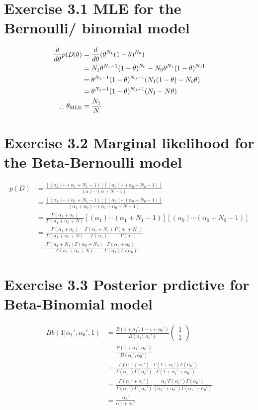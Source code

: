 \documentclass{jsarticle}
\begin{document}
\section*{Exercise 3.1 MLE for the Bernoulli/ binomial model}
\begin{align}
\frac{d}{d\theta}p(D|\theta) & = \frac{d}{d\theta}(\theta^{N_1}(1-\theta)^{N_0})\\
& = N_1 \theta^{N_1-1}(1-\theta)^{N_0}-N_0\theta^{N_1}(1-\theta)^{N_01}\\
& = \theta^{N_1-1}(1-\theta)^{N_0-1}(N_1(1-\theta)-N_0\theta) \\
& = \theta^{N_1-1}(1-\theta)^{N_0-1}(N_1-N\theta)\\
\therefore \theta_{\rm MLE} & =\frac{N_1}{N}
\end{align}

\section*{Exercise 3.2 Marginal likelihood for the Beta-Bernoulli model}
\begin{align}
p(D) & = \frac{[(\alpha_1)\cdots(\alpha_1+N_1-1)][(\alpha_0)\cdots(\alpha_0+N_0-1)]}{(\alpha)\cdots(\alpha + N - 1)}\\
& = \frac{[(\alpha_1)\cdots(\alpha_1+N_1-1)][(\alpha_0)\cdots(\alpha_0+N_0-1)]}{(\alpha_1+\alpha_0)\cdots(\alpha_1 + \alpha_0 + N - 1)}\\
& = \frac{\Gamma(\alpha_1+\alpha_0)}{\Gamma(\alpha_1+\alpha_0+N)}[(\alpha_1)\cdots (\alpha_1+N_1-1)][(\alpha_0)\cdots(\alpha_0+N_0-1)]\\
& = \frac{\Gamma(\alpha_1+\alpha_0)}{\Gamma(\alpha_1+\alpha_0+N)}\frac{\Gamma(\alpha_1+N_1)}{\Gamma(\alpha_1)}\frac{\Gamma(\alpha_0+N_0)}{\Gamma(\alpha_0)}\\
& = \frac{\Gamma(\alpha_1+N_1)\Gamma(\alpha_0+N_0)}{\Gamma(\alpha_1+\alpha_0+N)}\frac{\Gamma(\alpha_1+\alpha_0)}{\Gamma(\alpha_1)\Gamma(\alpha_0)}
\end{align}

\section*{Exercise 3.3 Posterior prdictive for Beta-Binomial model}
\begin{align}
Bb(1|\alpha_1',\alpha_0',1) & = \frac{B(1+\alpha_1',1-1+\alpha_0')}{B(\alpha_1',\alpha_0')} \begin{pmatrix} 1 \\ 1 \end{pmatrix} \\
& = \frac{B(1+\alpha_1', \alpha_0')}{B(\alpha_1',\alpha_0')}\\
& = \frac{\Gamma(\alpha_1'+\alpha_0')}{\Gamma(\alpha_1')\Gamma(\alpha_0')}\frac{\Gamma(1+\alpha_1')\Gamma(\alpha_0')}{\Gamma(1+\alpha_1'+\alpha_0')}\\
& = \frac{\Gamma(\alpha_1'+\alpha_0')}{\Gamma(\alpha_1')\Gamma(\alpha_0')}\frac{\alpha_1'\Gamma(\alpha_1')\Gamma(\alpha_0')}{(\alpha_1'+\alpha_0')\Gamma(\alpha_1'+\alpha_0')}\\
& = \frac{\alpha_1'}{\alpha_1'+\alpha_0'}
\end{align}
\end{document}
